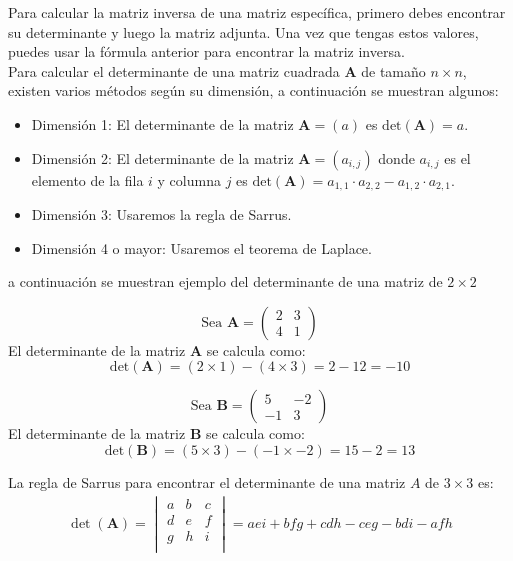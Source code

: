 Para calcular la matriz inversa de una matriz específica, primero debes encontrar su determinante y luego la matriz adjunta. Una vez que tengas estos valores, puedes usar la fórmula anterior para encontrar la matriz inversa.\\
Para calcular el determinante de una matriz cuadrada $\boldsymbol{A}$ de tamaño $n \times n$, existen varios métodos  según su dimensión, a continuación se muestran algunos:
\begin{itemize}
\item {Dimensión 1:} El determinante de la matriz \( \boldsymbol{A} = (a) \) es \( \text{det}(\boldsymbol{A}) = a \).

\item {Dimensión 2:} El determinante de la matriz \( \boldsymbol{A} = (a_{i,j}) \) donde \( a_{i,j} \) es el elemento de la fila \( i \) y columna \( j \) es \( \text{det}(\boldsymbol{A}) = a_{1,1} \cdot a_{2,2} - a_{1,2} \cdot a_{2,1} \).

\item {Dimensión 3:} Usaremos la regla de Sarrus.

\item {Dimensión 4 o mayor:} Usaremos el teorema de Laplace.
\end{itemize}
a continuación se muestran ejemplo del determinante de una matriz de $2\times2$\\
\begin{example}
\[
\text{Sea } \boldsymbol{A} = \begin{pmatrix}
2 & 3 \\
4 & 1
\end{pmatrix}
\]
El determinante de la matriz \( \boldsymbol{A} \) se calcula como:
\[
\text{det}(\boldsymbol{A}) = (2 \times 1) - (4 \times 3) = 2 - 12 = -10
\]  
\end{example}
\begin{example}
\[
\text{Sea } \boldsymbol{B} = \begin{pmatrix}
5 & -2 \\
-1 & 3
\end{pmatrix}
\]
El determinante de la matriz \( \boldsymbol{B} \) se calcula como:
\[
\text{det}(\boldsymbol{B}) = (5 \times 3) - (-1 \times -2) = 15 - 2 = 13
\]
\end{example}
La regla de Sarrus para encontrar el determinante de una matriz \( A \) de \( 3 \times 3 \) es:
\begin{align}
\label{sarrus}
  \det(\boldsymbol{A}) = 
\begin{vmatrix}
a & b & c \\
d & e & f \\
g & h & i \\
\end{vmatrix}
= aei + bfg + cdh - ceg - bdi - afh  
\end{align}


